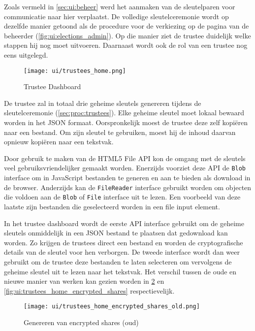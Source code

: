 \npar Zoals vermeld in \ref{sec:ui:beheer} werd het aanmaken van de sleutelparen voor communicatie naar hier verplaatst. De volledige sleutelceremonie wordt op dezelfde manier getoond als de procedure voor de verkiezing op de pagina van de beheerder (\ref{fig:ui:elections_admin}). Op die manier ziet de trustee duidelijk welke stappen hij nog moet uitvoeren. Daarnaast wordt ook de rol van een trustee nog eens uitgelegd.

\begin{figure}
  \centering
  \texttt{[image: ui/trustees\_home.png]}
  \caption{Trustee Dashboard}
  \label{fig:ui:trustees_home}
\end{figure}

\npar De trustee zal in totaal drie geheime sleutels genereren tijdens de sleutelceremonie (\ref{sec:proc:trustees}). Elke geheime sleutel moet lokaal bewaard worden in het JSON formaat. Oorspronkelijk moest de trustee deze zelf kopi\"eren naar een bestand. Om zijn sleutel te gebruiken, moest hij de inhoud daarvan opnieuw kopi\"eren naar een tekstvak.

\npar Door gebruik te maken van de HTML5 File API kon de omgang met de sleutels veel gebruiksvriendelijker gemaakt worden.\cite{ranganathan_sicking_file_api} Enerzijds voorziet deze API de \texttt{Blob} interface om in JavaScript bestanden te generen en aan te bieden als download in de browser. Anderzijds kan de \texttt{FileReader} interface gebruikt worden om objecten die voldoen aan de \texttt{Blob} of \texttt{File} interface uit te lezen. Een voorbeeld van deze laatste zijn bestanden die geselecteerd worden in een file input element.

\npar In het trustee dashboard wordt de eerste API interface gebruikt om de geheime sleutels onmiddelijk in een JSON bestand te plaatsen dat gedownload kan worden. Zo krijgen de trustees direct een bestand en worden de cryptografische details van de sleutel voor hen verborgen. De tweede interface wordt dan weer gebruikt om de trustee deze bestanden te laten selecteren om vervolgens de geheime sleutel uit te lezen naar het tekstvak. Het verschil tussen de oude en nieuwe manier van werken kan gezien worden in \ref{fig:ui:trustees_home_encrypted_shares_old} en \ref{fig:ui:trustees_home_encrypted_shares} respectievelijk.

\begin{figure}
  \centering
  \texttt{[image: ui/trustees\_home\_encrypted\_shares\_old.png]}
  \caption{Genereren van encrypted shares (oud)}
  \label{fig:ui:trustees_home_encrypted_shares_old}
\end{figure}

